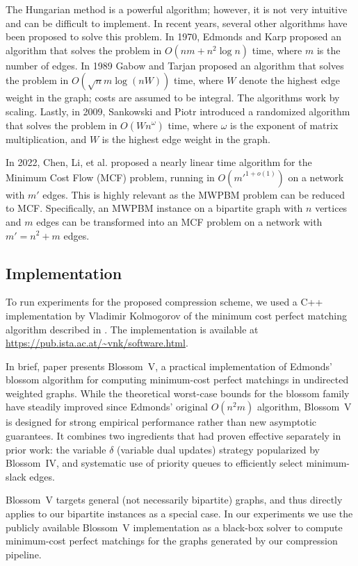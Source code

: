The Hungarian method is a powerful algorithm; however, it is not very intuitive and can be difficult to implement. In recent years, several other algorithms have been proposed to solve this problem. In 1970, Edmonds and Karp \cite{edmonds1972theoretical} proposed an algorithm that solves the problem in $O(nm + n^2 \log n)$ time, where $m$ is the number of edges. In 1989 Gabow and Tarjan \cite{gabow1989faster} proposed an algorithm that solves the problem in $O(\sqrt{n}m \log(nW))$ time, where $W$ denote the highest edge weight in the graph; costs are assumed to be integral. The algorithms work by scaling. Lastly, in 2009, Sankowski and Piotr \cite{sankowski2009maximum} introduced a randomized algorithm that solves the problem in $O(Wn^\omega)$ time, where $\omega$ is the exponent of matrix multiplication, and $W$ is the highest edge weight in the graph.

In 2022, Chen, Li, et al. \cite{chen2022maximum} proposed a nearly linear time algorithm for the Minimum Cost Flow (MCF) problem, running in $O(m'^{1+o(1)})$ on a network with $m'$ edges. This is highly relevant as the MWPBM problem can be reduced to MCF. Specifically, an MWPBM instance on a bipartite graph with $n$ vertices and $m$ edges can be transformed into an MCF problem on a network with $m' = n^2 + m$ edges.

\subsection{Implementation}
To run experiments for the proposed compression scheme, we used a C++ implementation by Vladimir Kolmogorov of the minimum cost perfect matching algorithm described in \cite{kolmogorovBlossomNewImplementation2009}. The implementation is available at \url{https://pub.ista.ac.at/~vnk/software.html}.

In brief, paper \cite{kolmogorovBlossomNewImplementation2009} presents Blossom~V, a practical implementation of Edmonds’ blossom algorithm for computing minimum-cost perfect matchings in undirected weighted graphs. While the theoretical worst-case bounds for the blossom family have steadily improved since Edmonds’ original $O(n^2m)$ algorithm, Blossom~V is designed for strong empirical performance rather than new asymptotic guarantees. It combines two ingredients that had proven effective separately in prior work: the variable $\delta$ (variable dual updates) strategy popularized by Blossom~IV, and systematic use of priority queues to efficiently select minimum-slack edges.

Blossom~V targets general (not necessarily bipartite) graphs, and thus directly applies to our bipartite instances as a special case. In our experiments we use the publicly available Blossom~V implementation as a black-box solver to compute minimum-cost perfect matchings for the graphs generated by our compression pipeline.
